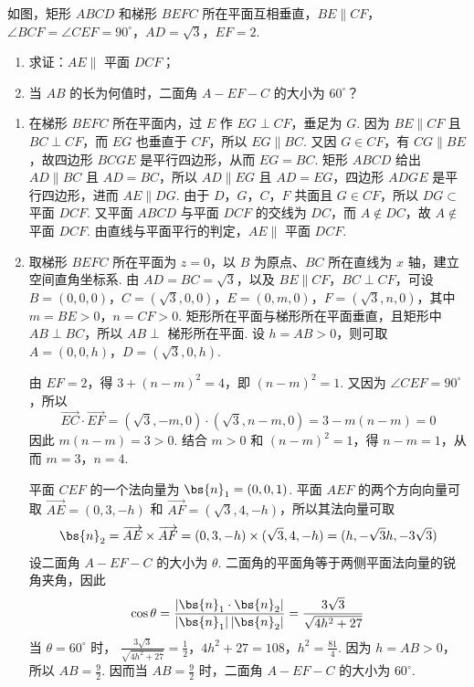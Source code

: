 \begin{problem}
如图，矩形 \(ABCD\) 和梯形 \(BEFC\) 所在平面互相垂直，\(BE \parallel CF\)，\(\angle BCF = \angle CEF = 90^\circ\)，\(AD = \sqrt{3}\)，\(EF = 2\).

\begin{enumerate}
\item 求证：\(AE \parallel\) 平面 \(DCF\)；
\item 当 \(AB\) 的长为何值时，二面角 \(A - EF - C\) 的大小为 \(60^{\circ}\)？
\end{enumerate}

\end{problem}

\begin{solution}
\begin{enumerate}
\item 在梯形 \(BEFC\) 所在平面内，过 \(E\) 作 \(EG\perp CF\)，垂足为 \(G\). 因为 \(BE\parallel CF\) 且 \(BC\perp CF\)，而 \(EG\) 也垂直于 \(CF\)，所以 \(EG\parallel BC\). 又因 \(G\in CF\)，有 \(CG\parallel BE\)，故四边形 \(BCGE\) 是平行四边形，从而 \(EG=BC\). 矩形 \(ABCD\) 给出 \(AD\parallel BC\) 且 \(AD=BC\)，所以 \(AD\parallel EG\) 且 \(AD=EG\)，四边形 \(ADGE\) 是平行四边形，进而 \(AE\parallel DG\). 由于 \(D\)，\(G\)，\(C\)，\(F\) 共面且 \(G\in CF\)，所以 \(DG\subset\) 平面 \(DCF\). 又平面 \(ABCD\) 与平面 \(DCF\) 的交线为 \(DC\)，而 \(A\notin DC\)，故 \(A\notin\) 平面 \(DCF\). 由直线与平面平行的判定，\(AE\parallel\) 平面 \(DCF\).

\item 取梯形 \(BEFC\) 所在平面为 \(z=0\)，以 \(B\) 为原点、\(BC\) 所在直线为 \(x\) 轴，建立空间直角坐标系. 由 \(AD=BC=\sqrt3\)，以及 \(BE\parallel CF\)，\(BC\perp CF\)，可设 \(B=(0,0,0)\)，\(C=(\sqrt3,0,0)\)，\(E=(0,m,0)\)，\(F=(\sqrt3,n,0)\)，其中 \(m=BE>0\)，\(n=CF>0\). 矩形所在平面与梯形所在平面垂直，且矩形中 \(AB\perp BC\)，所以 \(AB\perp\) 梯形所在平面. 设 \(h=AB>0\)，则可取 \(A=(0,0,h)\)，\(D=(\sqrt3,0,h)\).

由 \(EF=2\)，得 \(3+(n-m)^2=4\)，即 \((n-m)^2=1\). 又因为 \(\angle CEF=90^\circ\)，所以
\[
\overrightarrow{EC}\cdot\overrightarrow{EF}=(\sqrt3,-m,0)\cdot(\sqrt3,n-m,0)=3-m(n-m)=0
\]
因此 \(m(n-m)=3>0\). 结合 \(m>0\) 和 \((n-m)^2=1\)，得 \(n-m=1\)，从而 \(m=3\)，\(n=4\).

平面 \(CEF\) 的一个法向量为 \(\bs{n}_1=(0,0,1)\). 平面 \(AEF\) 的两个方向向量可取 \(\overrightarrow{AE}=(0,3,-h)\) 和 \(\overrightarrow{AF}=(\sqrt3,4,-h)\)，所以其法向量可取
\[
\bs{n}_2=\overrightarrow{AE}\times\overrightarrow{AF}=(0,3,-h)\times(\sqrt3,4,-h)=(h,-\sqrt3h,-3\sqrt3)
\]
设二面角 \(A-EF-C\) 的大小为 \(\theta\). 二面角的平面角等于两侧平面法向量的锐角夹角，因此
\[
\cos\theta=\frac{|\bs{n}_1\cdot\bs{n}_2|}{|\bs{n}_1|\,|\bs{n}_2|}=\frac{3\sqrt3}{\sqrt{4h^2+27}}
\]
当 \(\theta=60^\circ\) 时，
\(\frac{3\sqrt3}{\sqrt{4h^2+27}}=\frac12\)，\(4h^2+27=108\)，\(h^2=\frac{81}{4}\).
因为 \(h=AB>0\)，所以 \(AB=\frac92\). 因而当 \(AB=\frac92\) 时，二面角 \(A-EF-C\) 的大小为 \(60^\circ\).
\end{enumerate}
\end{solution}

